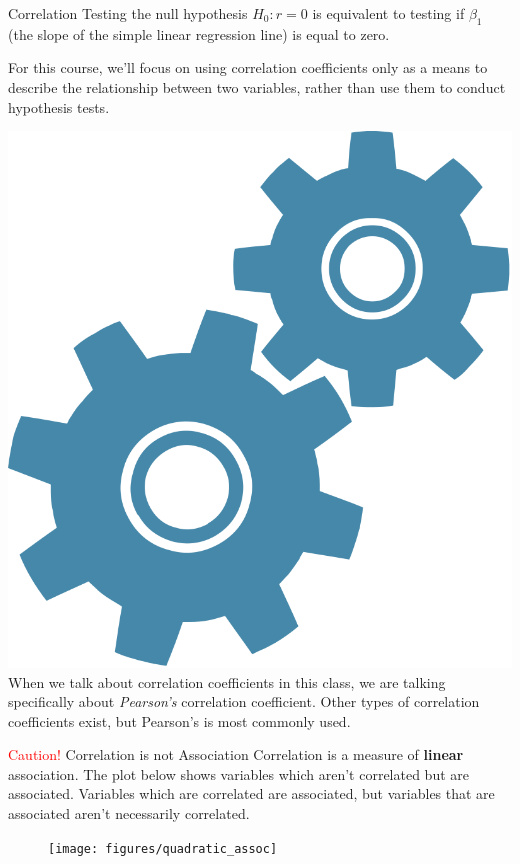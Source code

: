 \documentclass[10pt,t]{beamer}
\begin{document}
\begin{frame}{Correlation}
Testing the null hypothesis $H_0: r = 0$ is equivalent to testing if $\beta_1$ (the slope of the simple linear regression line) is equal to zero. 



\vspace{0.3cm}

For this course, we'll focus on using correlation coefficients only as a means to describe the relationship between two variables, rather than use them to conduct hypothesis tests.

\vspace{0.3cm}

\includegraphics[scale=0.02]{figures/technical} When we talk about correlation coefficients in this class, we are talking specifically about \textit{Pearson's} correlation coefficient. Other types of correlation coefficients exist, but Pearson's is most commonly used.
\end{frame}

\begin{frame}{\textcolor{red}{Caution!} Correlation is not Association}
	Correlation is a measure of \textbf{linear} association. The plot below shows variables which aren't correlated but are associated. Variables which are correlated are associated, but variables that are associated aren't necessarily correlated.
	
	\begin{figure}
		\centering
		\texttt{[image: figures/quadratic\_assoc]}
	\end{figure}
\end{frame}
\end{document}

